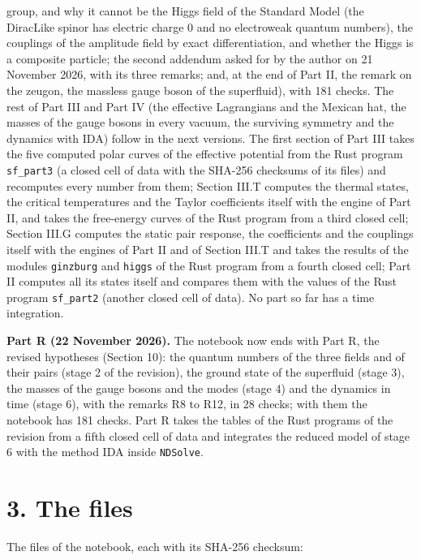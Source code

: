 \documentclass[
  10pt,
]{article}
\begin{document}
group, and why it cannot be the Higgs field of the Standard Model (the
DiracLike spinor has electric charge 0 and no electroweak quantum
numbers), the couplings of the amplitude field by exact differentiation,
and whether the Higgs is a composite particle; the second addendum asked
for by the author on 21 November 2026, with its three remarks; and, at
the end of Part II, the remark on the zeugon, the massless gauge boson
of the superfluid), with 181 checks. The rest of Part III and Part IV
(the effective Lagrangians and the Mexican hat, the masses of the gauge
bosons in every vacuum, the surviving symmetry and the dynamics with
IDA) follow in the next versions. The first section of Part III takes
the five computed polar curves of the effective potential from the Rust
program \texttt{sf\_part3} (a closed cell of data with the SHA-256
checksums of its files) and recomputes every number from them; Section
III.T computes the thermal states, the critical temperatures and the
Taylor coefficients itself with the engine of Part II, and takes the
free-energy curves of the Rust program from a third closed cell; Section
III.G computes the static pair response, the coefficients and the
couplings itself with the engines of Part II and of Section III.T and
takes the results of the modules \texttt{ginzburg} and \texttt{higgs} of
the Rust program from a fourth closed cell; Part II computes all its
states itself and compares them with the values of the Rust program
\texttt{sf\_part2} (another closed cell of data). No part so far has a
time integration.

\textbf{Part R (22 November 2026).} The notebook now ends with Part R,
the revised hypotheses (Section 10): the quantum numbers of the three
fields and of their pairs (stage 2 of the revision), the ground state of
the superfluid (stage 3), the masses of the gauge bosons and the modes
(stage 4) and the dynamics in time (stage 6), with the remarks R8 to
R12, in 28 checks; with them the notebook has 181 checks. Part R takes
the tables of the Rust programs of the revision from a fifth closed cell
of data and integrates the reduced model of stage 6 with the method IDA
inside \texttt{NDSolve}.

\hypertarget{the-files}{%
\section{3. The files}\label{the-files}}

The files of the notebook, each with its SHA-256 checksum:
\end{document}
